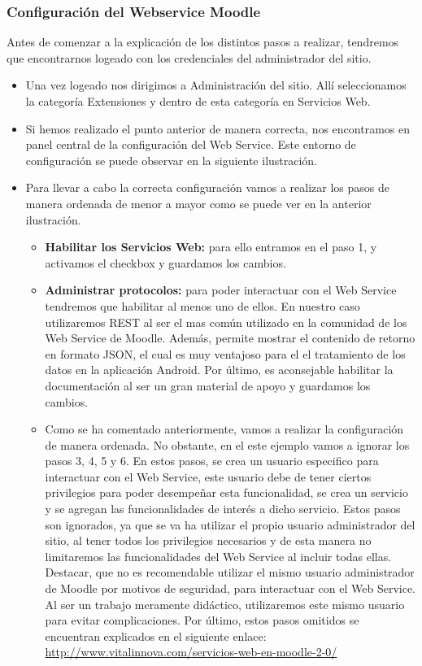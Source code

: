 \subsubsection{Configuración del Webservice Moodle}

Antes de comenzar a la explicación de los distintos pasos a realizar, tendremos que encontrarnos logeado con los credenciales del administrador del sitio.

\begin{itemize}

	\item Una vez logeado nos dirigimos a Administración del sitio. Allí seleccionamos la categoría Extensiones y dentro de esta categoría en Servicios Web.
	\item Si hemos realizado el punto anterior de manera correcta, nos encontramos en panel central de la configuración del Web Service. Este entorno de configuración se puede observar en la siguiente ilustración.
	
	\item Para llevar a cabo la correcta configuración vamos a realizar los pasos de manera ordenada de menor a mayor como se puede ver en la anterior ilustración. 
	\begin{itemize}
	
		\item \textbf{Habilitar los Servicios Web:} para ello entramos en el paso 1, y activamos el checkbox y guardamos los cambios.
		
		\item \textbf{Administrar protocolos:} para poder interactuar con el Web Service tendremos que habilitar al menos uno de ellos. En nuestro caso utilizaremos REST al ser el mas común utilizado en la comunidad de los Web Service de Moodle. Además, permite mostrar el contenido de retorno en formato JSON, el cual es muy ventajoso para el el tratamiento de los datos en la aplicación Android. Por último, es aconsejable habilitar la documentación al ser un gran material de apoyo y guardamos los cambios.
		
		\item Como se ha comentado anteriormente, vamos a realizar la configuración de manera ordenada. No obstante, en el este ejemplo vamos a ignorar los pasos 3, 4, 5 y 6. En estos pasos, se crea un usuario especifico para interactuar con el Web Service, este usuario debe de tener ciertos privilegios para poder desempeñar esta funcionalidad, se crea un servicio y se agregan las funcionalidades de interés a dicho servicio. Estos pasos son ignorados, ya que se va ha utilizar el propio usuario administrador del sitio, al tener todos los privilegios necesarios y de esta manera no limitaremos las funcionalidades del Web Service al incluir todas ellas. Destacar, que no es recomendable utilizar el mismo usuario administrador de Moodle por motivos de seguridad, para interactuar con el Web Service. Al ser un trabajo meramente didáctico, utilizaremos este mismo usuario para evitar complicaciones.
Por último, estos pasos omitidos se encuentran explicados en el siguiente enlace:
\url{http://www.vitalinnova.com/servicios-web-en-moodle-2-0/}
		

\end{itemize}
\end{itemize}
